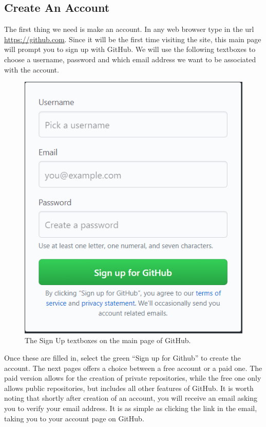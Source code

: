 \documentclass[11pt]{article}
\begin{document}
\subsection{Create An Account}

The first thing we need is make an account. In any web browser type in the url \url{https://github.com}. Since it will be the first time visiting the site, this main page will prompt you to sign up with GitHub. We will use the following textboxes to choose a username, password and which email address we want to be associated with the account.

\begin{figure}[h!]
\begin{center}
\includegraphics[scale=.5]{GithubSignup.png} 
\caption{The Sign Up textboxes on the main page of GitHub.}
\end{center}
\end{figure} 

Once these are filled in, select the green ``Sign up for Github'' to create the account. The next pages offers a choice between a free account or a paid one. The paid version allows for the creation of private repositories, while the free one only allows public repositories, but includes all other features of GitHub. It is worth noting that shortly after creation of an account, you will receive an email asking you to verify your email address. It is as simple as clicking the link in the email, taking you to your account page on GitHub.
\end{document}
